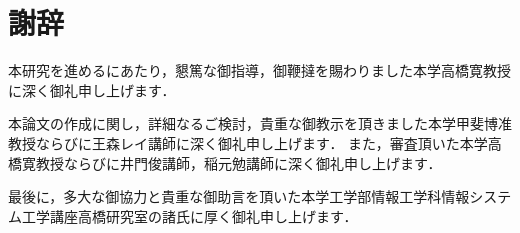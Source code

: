 \newpage
{}
\chapter*{謝辞}
本研究を進めるにあたり，懇篤な御指導，御鞭撻を賜わりました本学高橋寛教授に深く御礼申し上げます．

本論文の作成に関し，詳細なるご検討，貴重な御教示を頂きました本学甲斐博准教授ならびに王森レイ講師に深く御礼申し上げます．
また，審査頂いた本学高橋寛教授ならびに井門俊講師，稲元勉講師に深く御礼申し上げます．

最後に，多大な御協力と貴重な御助言を頂いた本学工学部情報工学科情報システム工学講座高橋研究室の諸氏に厚く御礼申し上げます．


